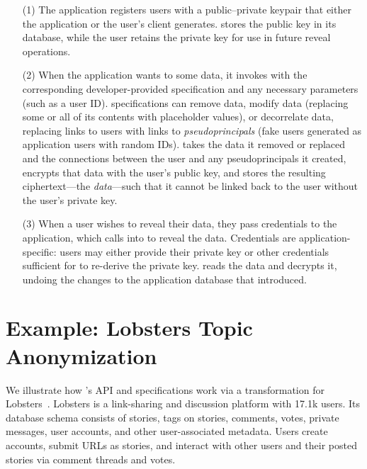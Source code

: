 \begin{enumerate}[nosep]
%
    \item[(1)] The application registers users with a public--private keypair
that either the application or the user's client generates. \sys stores the
public key in its database, while the user retains the private key for use in
future reveal operations.
%

%
\item[(2)] When the application wants to \xx some data, it invokes \sys with the
corresponding developer-provided \xx specification and any necessary
parameters (such as a user ID).
%
\Xx specifications can remove data, modify data (replacing some or all of its
contents with placeholder values), or decorrelate data, replacing
links to users with links to \emph{pseudoprincipals} (fake users generated as
application users with random IDs).
%
%
\sys takes the data it removed or replaced and the connections between the user
and any pseudoprincipals it created, encrypts that data with the user's public
key, and stores the resulting ciphertext---the \emph{\xxed data}---such that it
cannot be linked back to the user without the user's
private key.
%

%
\item[(3)] When a user wishes to reveal their \xxed data, they pass credentials
to the application, which calls into \sys to reveal the data.
%
Credentials are application-specific: users may either provide their private
key or other credentials sufficient for \sys to re-derive the private key.
%
\sys reads the \xxed data and decrypts it, undoing the changes to the
application database that \xxing introduced.
\end{enumerate}
%

%

\section{Example: Lobsters Topic Anonymization}
\label{s:design:lobsters}

We illustrate how \sys's API and \xx specifications work via a \xxing
transformation for Lobsters~\cite{lobsters}.  Lobsters is a
link-sharing and discussion platform with 17.1k
users.
%
Its database schema consists of stories, tags on stories, comments, votes,
private messages, user accounts, and other user-associated metadata.
%
Users create accounts, submit URLs as stories, and interact with other users
and their posted stories via comment threads and votes.
%

